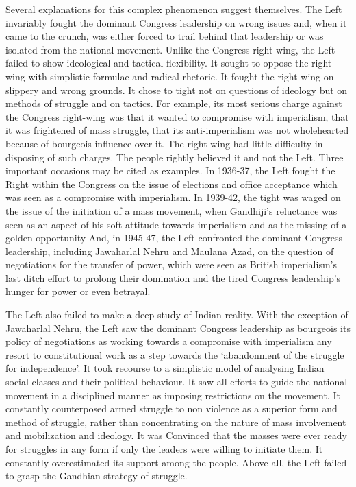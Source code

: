 Several explanations for this complex phenomenon suggest themselves. The Left invariably fought the dominant Congress leadership on wrong issues and, when it came to the crunch, was either forced to trail behind that leadership or was isolated from the national movement. Unlike the Congress right-wing, the Left failed to show ideological and tactical flexibility. It sought to oppose the right-wing with simplistic formulae and radical rhetoric. It fought the right-wing on slippery and wrong grounds. It chose to tight not on questions of ideology but on methods of struggle and on tactics. For example, its most serious charge against the Congress right-wing was that it wanted to compromise with imperialism, that it was frightened of mass struggle, that its anti-imperialism was not wholehearted because of bourgeois influence over it. The right-wing had little difficulty in disposing of such charges. The people rightly believed it and not the Left. Three important occasions may be cited as examples. In 1936-37, the Left fought the Right within the Congress on the issue of elections and office acceptance which was seen as a compromise with imperialism. In 1939-42, the tight was waged on the issue of the initiation of a mass movement, when Gandhiji's reluctance was seen as an aspect of his soft attitude towards imperialism and as the missing of a golden opportunity And, in 1945-47, the Left confronted the dominant Congress leadership, including Jawaharlal Nehru and Maulana Azad, on the question of negotiations for the transfer of power, which were seen as British imperialism's last ditch effort to prolong their domination and the tired Congress leadership's hunger for power or even betrayal. 

The Left also failed to make a deep study of Indian reality. With the exception of Jawaharlal Nehru, the Left saw the dominant Congress leadership as bourgeois its policy of negotiations as working towards a compromise with imperialism any resort to constitutional work as a step towards the `abandonment of the struggle for independence'. It took recourse to a simplistic model of analysing Indian social classes and their political behaviour. It saw all efforts to guide the national movement in a disciplined manner as imposing restrictions on the movement. It constantly counterposed armed struggle to non­ violence as a superior form and method of struggle, rather than concentrating on the nature of mass involvement and mobilization and ideology. It was Convinced that the masses were ever ready for struggles in any form if only the leaders were willing to initiate them. It constantly overestimated its support among the people. Above all, the Left failed to grasp the Gandhian strategy of struggle. 

